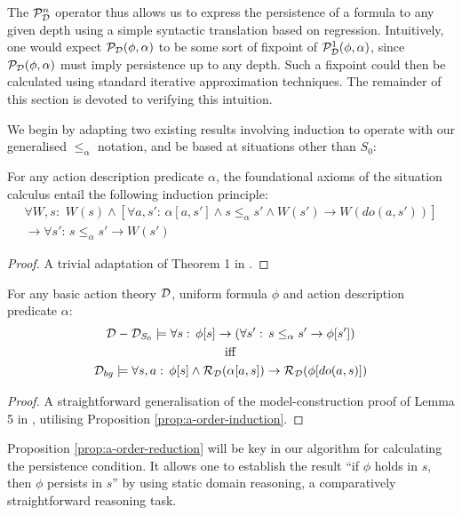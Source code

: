 The $\mathcal{P}_{\mathcal{D}}^{n}$ operator thus allows us to express the persistence
of a formula to any given depth using a simple syntactic translation
based on regression. Intuitively, one would expect $\mathcal{P}_{\mathcal{D}}(\phi,\alpha)$
to be some sort of fixpoint of $\mathcal{P}_{\mathcal{D}}^{1}(\phi,\alpha)$, since
$\mathcal{P}_{\mathcal{D}}(\phi,\alpha)$ must imply persistence up to any depth.
Such a fixpoint could then be calculated using standard iterative
approximation techniques. The remainder of this section is devoted
to verifying this intuition.

We begin by adapting two existing results involving induction to operate
with our generalised $\leq_{\alpha}$ notation, and be based at situations
other than $S_{0}$:

\begin{prop}
For any action description predicate $\alpha$, the foundational axioms
of the situation calculus entail the following induction principle:\label{prop:a-order-induction}\begin{multline*}
\forall W,s:\,\, W(s)\wedge\left[\forall a,s':\,\alpha[a,s']\wedge s\leq_{\alpha}s'\wedge W(s')\rightarrow W(do(a,s'))\right]\\
\rightarrow\forall s':\, s\leq_{\alpha}s'\rightarrow W(s')\end{multline*}

\end{prop}
\begin{proof}
A trivial adaptation of Theorem 1 in \citep{Reiter93proving}. 
\end{proof}
\begin{prop}
For any basic action theory $\mathcal{D}$, uniform formula $\phi$ and action
description predicate $\alpha$:\label{prop:a-order-reduction}\begin{gather*}
\mathcal{D}-\mathcal{D}_{S_{0}}\models\forall s:\,\phi[s]\rightarrow\left(\forall s':\, s\leq_{\alpha}s'\rightarrow\phi[s']\right)\\
\mathrm{iff}\\
\mathcal{D}_{bg}\models\forall s,a:\,\phi[s]\wedge\mathcal{R}_{\mathcal{D}}(\alpha[a,s])\rightarrow\mathcal{R}_{\mathcal{D}}(\phi[do(a,s)])\end{gather*}

\end{prop}
\begin{proof}
A straightforward generalisation of the model-construction proof of
Lemma 5 in \citep{Lin94-StateConstraints}, utilising Proposition
\ref{prop:a-order-induction}.
\end{proof}
Proposition \ref{prop:a-order-reduction} will be key in our algorithm
for calculating the persistence condition. It allows one to establish
the result {}``if $\phi$ holds in $s$, then $\phi$ persists in
$s$'' by using static domain reasoning, a comparatively straightforward
reasoning task.

